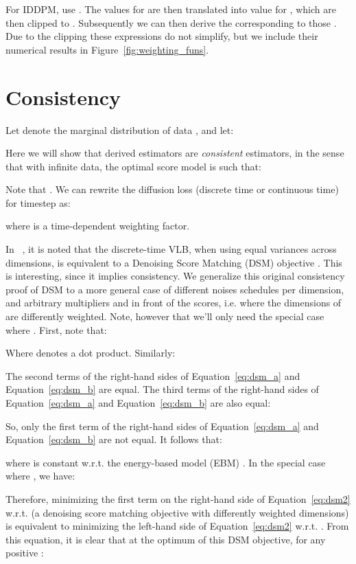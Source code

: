 \documentclass{article}
\def\Eqref#1{Equation~\ref{#1}}
\begin{document}
For IDDPM, \cite{nichol2021improved} use . The values for  are then translated into value for , which are then clipped to . Subsequently we can then derive the  corresponding to those . Due to the clipping these expressions do not simplify, but we include their numerical results in Figure~\ref{fig:weighting_funs}.


\section{Consistency}
\label{sec:dsm}

Let  denote the marginal distribution of data , and let:

Here we will show that derived estimators are \emph{consistent} estimators, in the sense that with infinite data, the optimal score model  is such that:


Note that . We can rewrite the diffusion loss (discrete time or continuous time) for timestep  as:

where  is a time-dependent weighting factor. 

In ~\citep{ho2020denoising}, it is noted that the discrete-time VLB, when using equal variances across dimensions, is equivalent to a Denoising Score Matching (DSM) objective \citep{vincent2011connection}. This is interesting, since it implies consistency. We generalize this original consistency proof of DSM to a more general case of different noises schedules per dimension, and arbitrary multipliers  and  in front of the scores, i.e. where the dimensions of  are differently weighted. Note, however that we'll only need the special case where . 
First, note that:

Where  denotes a dot product. Similarly:

The second terms of the right-hand sides of \Eqref{eq:dsm_a} and \Eqref{eq:dsm_b} are equal. The third terms of the right-hand sides of \Eqref{eq:dsm_a} and \Eqref{eq:dsm_b} are also equal:

So, only the first term of the right-hand sides of \Eqref{eq:dsm_a} and \Eqref{eq:dsm_b} are not equal. It follows that:

where  is constant w.r.t. the energy-based model (EBM) . In the special case where , we have:

Therefore, minimizing the first term on the right-hand side of \Eqref{eq:dsm2} w.r.t.  (a denoising score matching objective with differently weighted dimensions) is equivalent to minimizing the left-hand side of \Eqref{eq:dsm2} w.r.t. . 
From this equation, it is clear that at the optimum of this DSM objective, for any positive :
\end{document}
